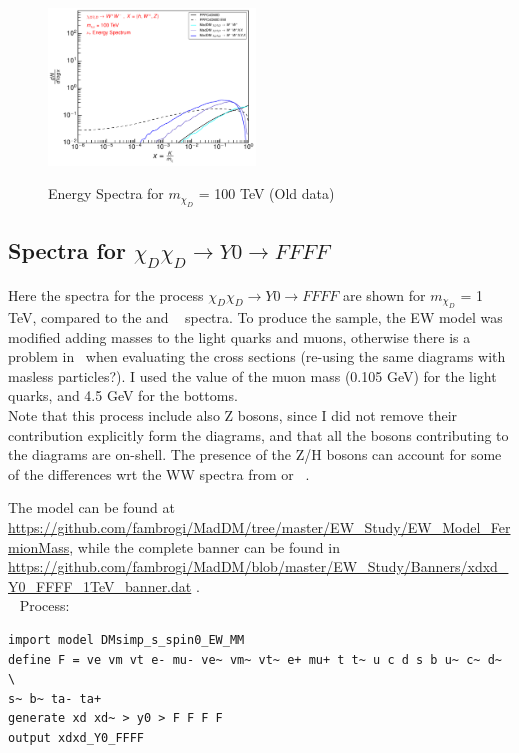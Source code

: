 \documentclass[epj,nopacs,fleqn]{svjour}
\begin{document}
\begin{figure}[!b]
\subfigure
{ \includegraphics[width=0.49\textwidth]{Fig/100TeV_OLD/OLD_100000_neutrinos_tau_PPPC_Comparison_xdxd_100000.pdf}}
\caption{Energy Spectra for $m_{\chi_D}$ = 100 TeV (Old data)}
\end{figure}
%

\clearpage
\subsection{Spectra for $\chi_D \chi_D \rightarrow Y0 \rightarrow FFFF$}

Here the spectra for the process $\chi_D \chi_D \rightarrow Y0 \rightarrow FFFF$ are shown for $m_{\chi_D}$ = 1 TeV, compared to the \PPPC and \PPPCew~ spectra. To produce the sample, the EW model was modified adding masses to the light quarks and muons, otherwise there is a problem in \MG~when evaluating the cross sections (re-using the same diagrams with masless particles?). I used the value of the muon mass (0.105 GeV) for the light quarks, and 4.5 GeV for the bottoms. \\
Note that this process include also Z bosons, since I did not remove their contribution explicitly form the diagrams, and that all the bosons contributing to the diagrams are on-shell. The presence of the Z/H bosons can account for some of the differences wrt the WW spectra from \PPPC or \PPPCew~.

The model can be found at {\color{blue} \url{https://github.com/fambrogi/MadDM/tree/master/EW_Study/EW_Model_FermionMass}}, while the complete banner can be found in {\color{blue} \url{https://github.com/fambrogi/MadDM/blob/master/EW_Study/Banners/xdxd_Y0_FFFF_1TeV_banner.dat} }.
\\


\MG~ Process:
\begin{verbatim}
import model DMsimp_s_spin0_EW_MM
define F = ve vm vt e- mu- ve~ vm~ vt~ e+ mu+ t t~ u c d s b u~ c~ d~ \
s~ b~ ta- ta+
generate xd xd~ > y0 > F F F F
output xdxd_Y0_FFFF
\end{verbatim}
%
\\
\end{document}
